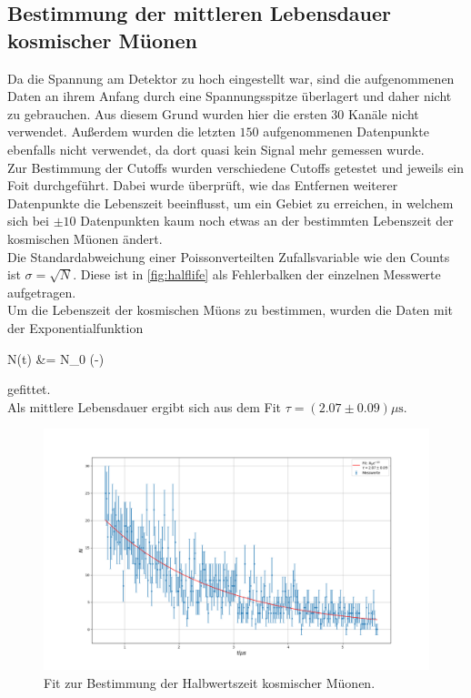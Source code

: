 \subsection{Bestimmung der mittleren Lebensdauer kosmischer Müonen}
Da die Spannung am Detektor zu hoch eingestellt war, sind die aufgenommenen Daten an ihrem Anfang durch eine Spannungsspitze überlagert und daher nicht zu gebrauchen. Aus diesem Grund wurden hier die ersten $30$ Kanäle nicht verwendet. Außerdem wurden die letzten $150$ aufgenommenen Datenpunkte ebenfalls nicht verwendet, da dort quasi kein Signal mehr gemessen wurde.\\
Zur Bestimmung der Cutoffs wurden verschiedene Cutoffs getestet und jeweils ein Foit durchgeführt. Dabei wurde überprüft, wie das Entfernen weiterer Datenpunkte die Lebenszeit beeinflusst, um ein Gebiet zu erreichen, in welchem sich bei $\pm 10$ Datenpunkten kaum noch etwas an der bestimmten Lebenszeit der kosmischen Müonen ändert.\\
Die Standardabweichung einer Poissonverteilten Zufallsvariable wie den Counts ist $ \sigma = \sqrt{N}$. Diese ist in \autoref{fig:halflife} als Fehlerbalken der einzelnen Messwerte aufgetragen.\\
Um die Lebenszeit der kosmischen Müons zu bestimmen, wurden die Daten mit der Exponentialfunktion 
\begin{aquation}
    N\left(t\right) &= N_0 \exp\left(-\right)
\end{aquation}
gefittet.\\
Als mittlere Lebensdauer ergibt sich aus dem Fit $\tau = (2.07 \pm 0.09)\text{$\mu$s}$.


\begin{figure}
    \centering
    \includegraphics[width=\linewidth]{figures/halflife_fit.png}
    \caption{Fit zur Bestimmung der Halbwertszeit kosmischer Müonen.}
    \label{fig:halflife}
\end{figure}


